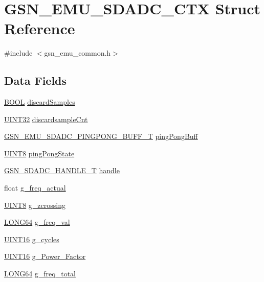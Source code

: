 \hypertarget{a00066}{
\section{GSN\_\-EMU\_\-SDADC\_\-CTX Struct Reference}
\label{a00066}
}


{\ttfamily \#include $<$gsn\_\-emu\_\-common.h$>$}

\subsection*{Data Fields}
\begin{DoxyCompactItemize}
\item 
\hyperlink{a00660_ga1f04022c0a182c51c059438790ea138c}{BOOL} \hyperlink{a00066_ac98ccba5b59681756606bf54aa602af4}{discardSamples}
\item 
\hyperlink{a00660_gae1e6edbbc26d6fbc71a90190d0266018}{UINT32} \hyperlink{a00066_a25e998c8317ee06f6d776a9a0d3c1597}{discardsampleCnt}
\item 
\hyperlink{a00067}{GSN\_\-EMU\_\-SDADC\_\-PINGPONG\_\-BUFF\_\-T} \hyperlink{a00066_a069558f9b87af8f37c508ad145a917c6}{pingPongBuff}
\item 
\hyperlink{a00660_gab27e9918b538ce9d8ca692479b375b6a}{UINT8} \hyperlink{a00066_a0e56c3b9f4b804edeb05c23ceb78f93a}{pingPongState}
\item 
\hyperlink{a00214}{GSN\_\-SDADC\_\-HANDLE\_\-T} \hyperlink{a00066_af2a1928de194a6cf6e6db41e7ebf7dd5}{handle}
\item 
float \hyperlink{a00066_a8932520e6108d066624f5a25af914002}{g\_\-freq\_\-actual}
\item 
\hyperlink{a00660_gab27e9918b538ce9d8ca692479b375b6a}{UINT8} \hyperlink{a00066_ab3bcbdee02debdf713730fbb251b274e}{g\_\-zcrossing}
\item 
\hyperlink{a00660_gae57305825c7d329ad8a3065ae045e875}{LONG64} \hyperlink{a00066_a08dc72ba00172cb2b164be338d8c4136}{g\_\-freq\_\-val}
\item 
\hyperlink{a00660_ga09f1a1fb2293e33483cc8d44aefb1eb1}{UINT16} \hyperlink{a00066_afbbacd7bf47d91e911aa7cae6ccdce28}{g\_\-cycles}
\item 
\hyperlink{a00660_ga09f1a1fb2293e33483cc8d44aefb1eb1}{UINT16} \hyperlink{a00066_a7f69a16edf8ccbde51d8d40f1f9b326d}{g\_\-Power\_\-Factor}
\item 
\hyperlink{a00660_gae57305825c7d329ad8a3065ae045e875}{LONG64} \hyperlink{a00066_ad919f55ae9858631874a76b9068c6ef1}{g\_\-freq\_\-total}
\item 

\end{DoxyCompactItemize}
